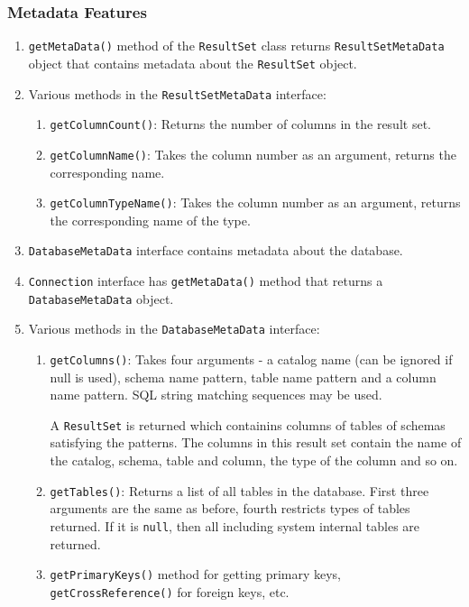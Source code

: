 \documentclass[journal,12pt,twocolumn]{IEEEtran}
\begin{document}
\subsubsection{Metadata Features}
\begin{enumerate}
     \item \texttt{getMetaData()} method of the \texttt{ResultSet} class returns
     \texttt{ResultSetMetaData} object that contains metadata about the
     \texttt{ResultSet} object.
     \item Various methods in the \texttt{ResultSetMetaData} interface:
     \begin{enumerate}
          \item \texttt{getColumnCount()}: Returns the number of columns in 
          the result set.
          \item \texttt{getColumnName()}: Takes the column number as an argument,
          returns the corresponding name.
          \item \texttt{getColumnTypeName()}: Takes the column number as an argument,
          returns the corresponding name of the type.
     \end{enumerate}
     \item \texttt{DatabaseMetaData} interface contains metadata about the database.
     \item \texttt{Connection} interface has \texttt{getMetaData()} method that 
     returns a \texttt{DatabaseMetaData} object.
     \item Various methods in the \texttt{DatabaseMetaData} interface:
     \begin{enumerate}
          \item \texttt{getColumns()}: Takes four arguments - a catalog name (can be
          ignored if null is used), schema name pattern, table name pattern and a 
          column name pattern. SQL string matching sequences may be used.

          A \texttt{ResultSet} is returned which containins columns of tables 
          of schemas satisfying the patterns. The columns in this result set
          contain the name of the catalog, schema, table and column, the type
          of the column and so on.
          \item \texttt{getTables()}: Returns a list of all tables in the
          database. First three arguments are the same as before, fourth 
          restricts types of tables returned. If it is \texttt{null}, then all 
          including system internal tables are returned.
          \item \texttt{getPrimaryKeys()} method for getting primary keys,
          \texttt{getCrossReference()} for foreign keys, etc.
     \end{enumerate}
\end{enumerate}
\end{document}
